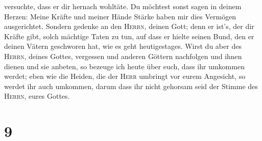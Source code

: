 versuchte, dass er dir hernach wohltäte.  Du möchtest
sonst sagen in deinem Herzen: Meine Kräfte und meiner Hände Stärke haben
mir dies Vermögen ausgerichtet.  Sondern gedenke an den
\textsc{Herrn}, deinen Gott; denn er ist's, der dir Kräfte gibt, solch
mächtige Taten zu tun, auf dass er hielte seinen Bund, den er deinen
Vätern geschworen hat, wie es geht heutigestages.  Wirst
du aber des \textsc{Herrn}, deines Gottes, vergessen und anderen Göttern
nachfolgen und ihnen dienen und sie anbeten, so bezeuge ich heute über
euch, dass ihr umkommen werdet;  eben wie die Heiden, die
der \textsc{Herr} umbringt vor eurem Angesicht, so werdet ihr auch
umkommen, darum dass ihr nicht gehorsam seid der Stimme des
\textsc{Herrn}, eures Gottes.

\hypertarget{section-8}{%
\section{9}\label{section-8}}

